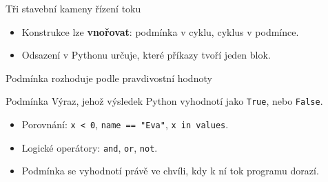 \documentclass[aspectratio=169,t]{beamer}
\begin{document}
\begin{frame}{Tři stavební kameny řízení toku}
  \centering
  \vspace{5mm}
  \vspace{7mm}
  \begin{itemize}
    \item Konstrukce lze \textbf{vnořovat}: podmínka v cyklu, cyklus v podmínce.
    \item Odsazení v Pythonu určuje, které příkazy tvoří jeden blok.
  \end{itemize}
\end{frame}

\begin{frame}{Podmínka rozhoduje podle pravdivostní hodnoty}
  \begin{block}{Podmínka}
    Výraz, jehož výsledek Python vyhodnotí jako \texttt{True}, nebo \texttt{False}.
  \end{block}
  \begin{itemize}
    \item Porovnání: \texttt{x < 0}, \texttt{name == "Eva"}, \texttt{x in values}.
    \item Logické operátory: \texttt{and}, \texttt{or}, \texttt{not}.
    \item Podmínka se vyhodnotí právě ve chvíli, kdy k ní tok programu dorazí.
  \end{itemize}
\end{frame}
\end{document}
